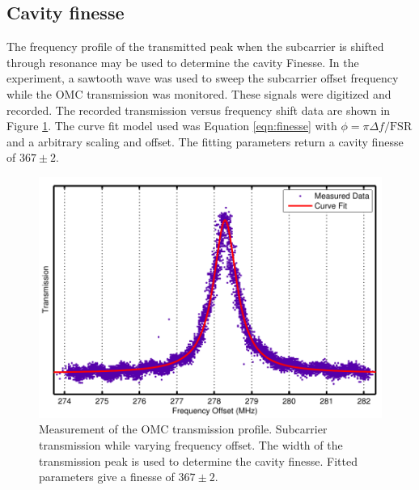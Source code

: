 \subsection{Cavity finesse}
The frequency profile of the transmitted peak when the subcarrier is shifted through resonance may be used to determine the cavity Finesse. %
In the experiment, a sawtooth wave was used to sweep the subcarrier offset frequency while the OMC transmission was monitored. %
These signals were digitized and recorded. %
The recorded transmission versus frequency shift data are shown in Figure \ref{fig:FSRfit}. %
The curve fit model used was Equation \ref{eqn:finesse} with $\phi=\pi \Delta f/\mathrm{FSR}$ and a arbitrary scaling and offset. %
The fitting parameters return a cavity finesse of $367\pm2$.
\begin{figure}
  \begin{center}
  \leavevmode
  \includegraphics{figs-omc/FSRfit.pdf}
  \end{center}
  \caption[Measurement of the OMC transmission profile.]{Measurement of the OMC transmission profile. Subcarrier transmission while varying frequency offset. The width of the transmission peak is used to determine the cavity finesse. Fitted parameters give a finesse of $367\pm2$. }
  \label{fig:FSRfit}
\end{figure}

